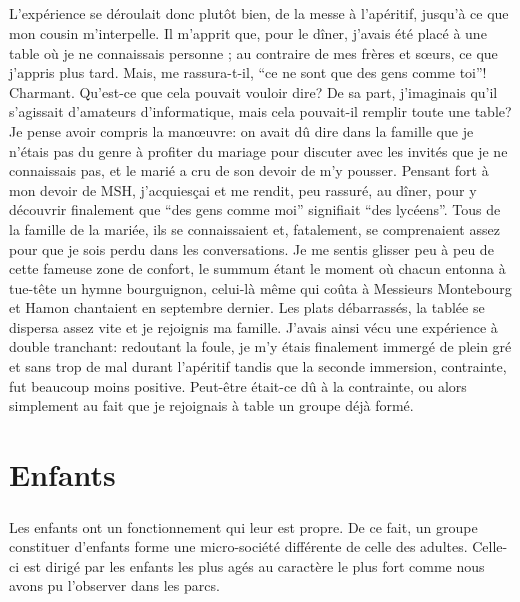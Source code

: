 \paragraph{} L'expérience se déroulait donc plutôt bien, de la messe à
l'apéritif, jusqu'à ce que mon cousin m'interpelle. Il m'apprit que, pour le
dîner, j'avais été placé à une table où je ne connaissais personne ; au
contraire de mes frères et sœurs, ce que j'appris plus tard. Mais, me
rassura-t-il, ``ce ne sont que des gens comme toi''! Charmant. Qu'est-ce que
cela pouvait vouloir dire? De sa part, j'imaginais qu'il s'agissait d'amateurs
d'informatique, mais cela pouvait-il remplir toute une table? Je pense avoir
compris la manœuvre: on avait dû dire dans la famille que je n'étais pas du
genre à profiter du mariage pour discuter avec les invités que je ne
connaissais pas, et le marié a cru de son devoir de m'y pousser. Pensant fort à
mon devoir de MSH, j'acquiesçai et me rendit, peu rassuré, au dîner, pour y
découvrir finalement que “des gens comme moi” signifiait “des lycéens”. Tous de
la famille de la mariée, ils se connaissaient et, fatalement, se comprenaient
assez pour que je sois perdu dans les conversations. Je me sentis glisser peu à
peu de cette fameuse zone de confort, le summum étant le moment où chacun
entonna à tue-tête un hymne bourguignon, celui-là même qui coûta à Messieurs
Montebourg et Hamon chantaient en septembre dernier.  Les plats débarrassés, la
tablée se dispersa assez vite et je rejoignis ma famille. J'avais ainsi vécu
une expérience à double tranchant: redoutant la foule, je m'y étais finalement
immergé de plein gré et sans trop de mal durant l'apéritif tandis que la
seconde immersion, contrainte, fut beaucoup moins positive. Peut-être était-ce
dû à la contrainte, ou alors simplement au fait que je rejoignais à table un
groupe déjà formé.


\chapter{Enfants}

\paragraph{}
Les enfants ont un fonctionnement qui leur est propre. De ce fait, un groupe constituer d'enfants forme une micro-société différente de celle des adultes. Celle-ci est dirigé par les enfants les plus agés au caractère le plus fort comme nous avons pu l'observer dans les parcs.

